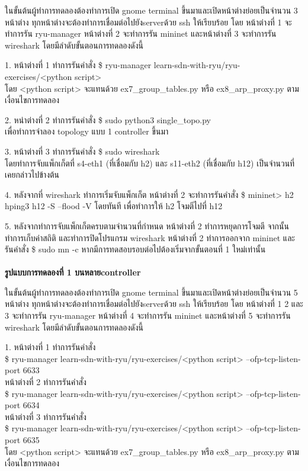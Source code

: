 ในขั้นต้นผู้ทำการทดลองต้องทำการเปิด gnome terminal ขึ้นมาและเปิดหน้าต่างย่อยเป็นจำนวน 3 หน้าต่าง
ทุกหน้าต่างจะต้องทำการเชื่อมต่อไปยัง\gls{server}ด้วย ssh ให้เรียบร้อย
โดย หน้าต่างที่ 1 จะทำการรัน ryu-manager หน้าต่างที่ 2 จะทำการรัน mininet และหน้าต่างที่ 3 จะทำการรัน wireshark
โดยมีลำดับขั้นตอนการทดลองดังนี้


1. หน้าต่างที่ 1 ทำการรันคำสั่ง    
\$ ryu-manager learn-sdn-with-ryu/ryu-exercises/<python script> \\
โดย <python script> จะแทนด้วย ex7\_group\_tables.py หรือ ex8\_arp\_proxy.py ตามเงื่อนไขการทดลอง

2. หน่าต่างที่ 2 ทำการรันคำสั่ง    
\$ sudo python3 single\_topo.py \\
เพื่อทำการจำลอง topology แบบ 1 \gls{controller} ขึ้นมา

3. หน้าต่างที่ 3 ทำการรันคำสั่ง 
\$ sudo wireshark \\
โดยทำการจับแพ็กเก็ตที่ s4-eth1 (ที่เชื่อมกับ h2) และ s11-eth2 (ที่เชื่อมกับ h12) เป็นจำนวนที่เคยกล่าวไปข้างต้น

4. หลังจากที่ wireshark ทำการเริ่มจับแพ็กเก็ต หน้าต่างที่ 2 จะทำการรันคำสั่ง \$ mininet> h2 hping3 h12 -S --flood -V
โดยทันที เพื่อทำการให้ h2 โจมตีไปที่ h12

5. หลังจากทำการจับแพ็กเก็ตครบตามจำนวนที่กำหนด หน้าต่างที่ 2 ทำการหยุดการโจมตี จากนั้นทำการเก็บค่าสถิติ และทำการปิดโปรแกรม wireshark
หน้าต่างที่ 2 ทำการออกจาก mininet และรันคำสั่ง \$ sudo mn -c หากมีการทดสอบรอบต่อไปต้องเริ่มจากขั้นตอนที่ 1 ใหม่เท่านั้น
\\\\
\textbf{รูปแบบการทดลองที่ 1 บนหลาย\gls{controller}}

ในขั้นต้นผู้ทำการทดลองต้องทำการเปิด gnome terminal ขึ้นมาและเปิดหน้าต่างย่อยเป็นจำนวน 5 หน้าต่าง
ทุกหน้าต่างจะต้องทำการเชื่อมต่อไปยัง\gls{server}ด้วย ssh ให้เรียบร้อย
โดย หน้าต่างที่ 1 2 และ 3 จะทำการรัน ryu-manager หน้าต่างที่ 4 จะทำการรัน mininet และหน้าต่างที่ 5 จะทำการรัน wireshark
โดยมีลำดับขั้นตอนการทดลองดังนี้

1. หน้าต่างที่ 1 ทำการรันคำสั่ง \\
\$ ryu-manager learn-sdn-with-ryu/ryu-exercises/<python script> --ofp-tcp-listen-port 6633 \\
\indent หน้าต่างที่ 2 ทำการรันคำสั่ง \\
\$ ryu-manager learn-sdn-with-ryu/ryu-exercises/<python script> --ofp-tcp-listen-port 6634  \\
\indent หน้าต่างที่ 3 ทำการรันคำสั่ง \\
\$ ryu-manager learn-sdn-with-ryu/ryu-exercises/<python script> --ofp-tcp-listen-port 6635  \\
โดย <python script> จะแทนด้วย 
ex7\_group\_tables.py หรือ ex8\_arp\_proxy.py
ตามเงื่อนไขการทดลอง

